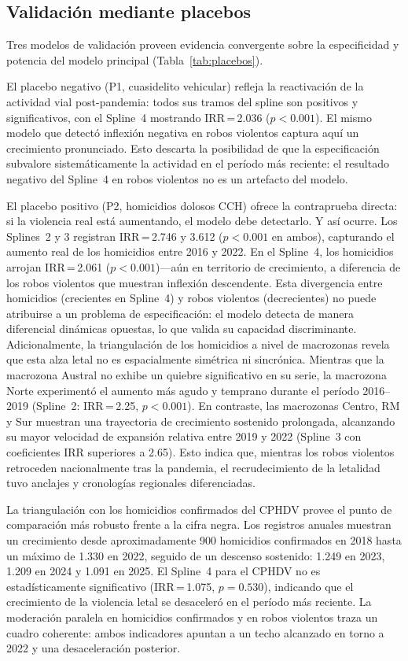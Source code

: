 \documentclass[12pt,a4paper]{article}
\begin{document}
\subsection{Validaci\'on mediante placebos}
\label{sub:placebos}

Tres modelos de validaci\'on proveen evidencia convergente sobre la especificidad y
potencia del modelo principal (Tabla~\ref{tab:placebos}).

El placebo negativo (P1, cuasidelito vehicular) refleja la reactivaci\'on de la
actividad vial post-pandemia: todos sus tramos del spline son positivos y significativos,
con el Spline~4 mostrando IRR\,=\,2.036 ($p<0.001$). El mismo modelo que detect\'o
inflexi\'on negativa en robos violentos captura aqu\'i un crecimiento pronunciado. Esto
descarta la posibilidad de que la especificaci\'on subvalore sistem\'aticamente la
actividad en el per\'iodo m\'as reciente: el resultado negativo del Spline~4 en robos
violentos no es un artefacto del modelo.

El placebo positivo (P2, homicidios dolosos CCH) ofrece la contraprueba directa: si la
violencia real est\'a aumentando, el modelo debe detectarlo. Y as\'i ocurre. Los
Splines~2 y 3 registran IRR\,=\,2.746 y 3.612 ($p<0.001$ en ambos), capturando el
aumento real de los homicidios entre 2016 y 2022. En el Spline~4, los homicidios
arrojan IRR\,=\,2.061 ($p<0.001$)---a\'un en territorio de crecimiento, a diferencia
de los robos violentos que muestran inflexi\'on descendente. Esta divergencia entre
homicidios (crecientes en Spline~4) y robos violentos (decrecientes) no puede atribuirse
a un problema de especificaci\'on: el modelo detecta de manera diferencial din\'amicas
opuestas, lo que valida su capacidad discriminante. Adicionalmente, la triangulaci\'on de los homicidios a nivel de macrozonas revela que esta alza letal no es espacialmente sim\'etrica ni sincr\'onica. Mientras que la macrozona Austral no exhibe un quiebre significativo en su serie, la macrozona Norte experiment\'o el aumento m\'as agudo y temprano durante el per\'iodo 2016--2019 (Spline~2: IRR\,=\,2.25, $p<0.001$). En contraste, las macrozonas Centro, RM y Sur muestran una trayectoria de crecimiento sostenido prolongada, alcanzando su mayor velocidad de expansi\'on relativa entre 2019 y 2022 (Spline~3 con coeficientes IRR superiores a 2.65). Esto indica que, mientras los robos violentos retroceden nacionalmente tras la pandemia, el recrudecimiento de la letalidad tuvo anclajes y cronolog\'ias regionales diferenciadas.

La triangulaci\'on con los homicidios confirmados del CPHDV provee el punto de
comparaci\'on m\'as robusto frente a la cifra negra. Los registros anuales muestran un
crecimiento desde aproximadamente 900 homicidios confirmados en 2018 hasta un m\'aximo
de 1.330 en 2022, seguido de un descenso sostenido: 1.249 en 2023, 1.209 en 2024 y
1.091 en 2025. El Spline~4 para el CPHDV no es estad\'isticamente significativo
(IRR\,=\,1.075, $p=0.530$), indicando que el crecimiento de la violencia letal se
desaceler\'o en el per\'iodo m\'as reciente. La moderaci\'on paralela en homicidios
confirmados y en robos violentos traza un cuadro coherente: ambos indicadores apuntan
a un techo alcanzado en torno a 2022 y una desaceleraci\'on posterior.
\end{document}
